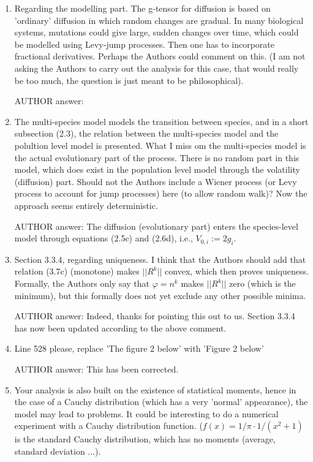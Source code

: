 \documentclass[a4paper,11pt]{scrartcl}
\let\phi\varphi
\begin{document}
\begin{enumerate}
\item
Regarding the modelling part. The g-tensor for diffusion is based on 'ordinary' diffusion in which random changes are gradual. In many biological systems, mutations could give large, sudden changes over time, which could be modelled using Levy-jump processes. Then one has to incorporate fractional derivatives. Perhaps the Authors could comment on this. (I am not asking the Authors to carry out the analysis for this case, that would really be too much, the question is just meant to be philosophical).

AUTHOR answer: 

\item
The multi-species model models the transition between species, and in a short subsection (2.3), the relation between the multi-species model and the polultion level model is presented. What I miss om the multi-species model is the actual evolutionary part of the process. There is no random part in this model, which does exist in the population level model through the volatility (diffusion) part. Should not the Authors include a Wiener process (or Levy process to account for jump processes) here (to allow random walk)? Now the approach seems entirely deterministic.

AUTHOR answer: The diffusion (evolutionary part) enters the species-level model through equations (2.5c) and (2.6d), i.e., $V_{0,i} := 2g_i$.

\item
Section 3.3.4, regarding uniqueness. I think that the Authors should add that relation (3.7c) (monotone) makes $||R^k||$ convex, which then proves uniqueness. Formally, the Authors only say that $\phi = n^k$ makes $||R^k||$ zero (which is the minimum), but this formally does not yet exclude any other possible minima.

AUTHOR answer: Indeed, thanks for pointing this out to us. Section 3.3.4 has now been updated according to the above comment.

\item
Line 528 please, replace 'The figure 2 below' with 'Figure 2 below'

AUTHOR answer: This has been corrected.

\item
Your analysis is also built on the existence of statistical moments, hence in the case of a Cauchy distribution (which has a very 'normal' appearance), the model may lead to problems. It could be interesting to do a numerical experiment with a Cauchy distribution function. ($f(x) = 1/\pi \cdot 1 / (x^2 + 1)$ is the standard Cauchy distribution, which has no moments (average, standard deviation ...).


\end{enumerate}
\end{document}
